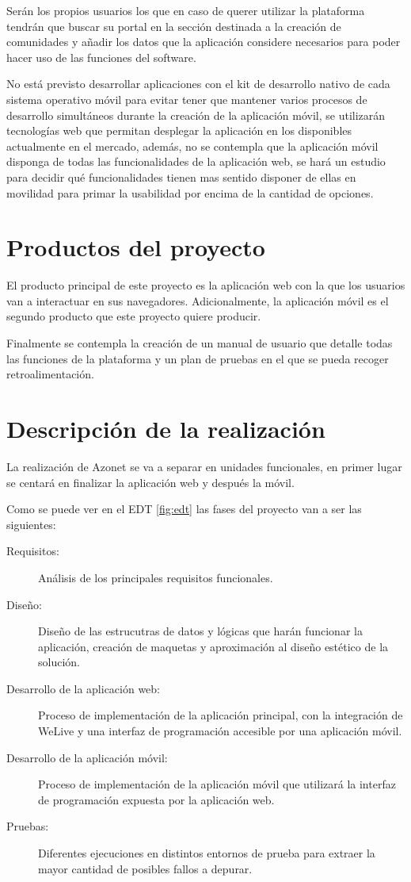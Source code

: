 \documentclass{DeustoFDP}
\begin{document}
Serán los propios usuarios los que en caso de querer utilizar la plataforma tendrán que buscar su portal en la sección destinada a la creación de comunidades y añadir los datos que la aplicación considere necesarios para poder hacer uso de las funciones del software.

No está previsto desarrollar aplicaciones con el kit de desarrollo nativo de cada sistema operativo móvil para evitar tener que mantener varios procesos de desarrollo simultáneos durante la creación de la aplicación móvil, se utilizarán tecnologías web que permitan desplegar la aplicación en los disponibles actualmente en el mercado, además, no se contempla que la aplicación móvil disponga de todas las funcionalidades de la aplicación web, se hará un estudio para decidir qué funcionalidades tienen mas sentido disponer de ellas en movilidad para primar la usabilidad por encima de la cantidad de opciones.

\section{Productos del proyecto}
El producto principal de este proyecto es la aplicación web con la que los usuarios van a interactuar en sus navegadores. Adicionalmente, la aplicación móvil es el segundo producto que este proyecto quiere producir.

Finalmente se contempla la creación de un manual de usuario que detalle todas las funciones de la plataforma y un plan de pruebas en el que se pueda recoger retroalimentación.

\section{Descripción de la realización}
La realización de Azonet se va a separar en unidades funcionales, en primer lugar se centará en finalizar la aplicación web y después la móvil.

Como se puede ver en el EDT \ref{fig:edt} las fases del proyecto van a ser las siguientes:
\begin{description}
  \item[Requisitos:] Análisis de los principales requisitos funcionales.
  \item[Diseño:] Diseño de las estrucutras de datos y lógicas que harán funcionar la aplicación, creación de maquetas y aproximación al diseño estético de la solución.
  \item[Desarrollo de la aplicación web:] Proceso de implementación de la aplicación principal, con la integración de WeLive y una interfaz de programación accesible por una aplicación móvil.
  \item[Desarrollo de la aplicación móvil:] Proceso de implementación de la aplicación móvil que utilizará la interfaz de programación expuesta por la aplicación web.
  \item[Pruebas:] Diferentes ejecuciones en distintos entornos de prueba para extraer la mayor cantidad de posibles fallos a depurar.
\end{description}
\end{document}
